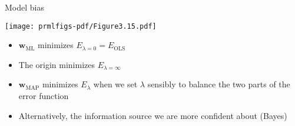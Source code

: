 \documentclass{hertieteaching}
\begin{document}


%
%
%
%


\begin{frame}{Model bias}
\medskip
\centerline{\texttt{[image: prmlfigs-pdf/Figure3.15.pdf]}}

\begin{itemize}
  \item $\textbf{w}_\text{ML}$ minimizes $E_{\lambda=0} = E_\text{OLS}$
  \item The origin minimizes $E_{\lambda=\infty}$
  \item $\textbf{w}_\text{MAP}$ minimizes $E_\lambda$ when we set $\lambda$ sensibly to balance the two parts of the error function
  \item Alternatively, the information source we are more confident about (Bayes)
\end{itemize}

\end{frame}
%
%
\end{document}
